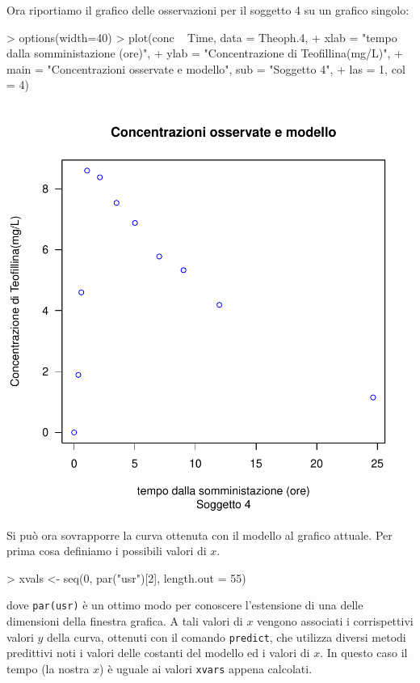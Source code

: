 \documentclass[onecolumn,11pt]{book}
\begin{document}
Ora riportiamo il grafico delle osservazioni per il soggetto 4 su un grafico singolo:

\begin{Schunk}
\begin{Sinput}
> options(width=40)
> plot(conc ~ Time, data = Theoph.4,
+ xlab = "tempo dalla somministazione (ore)",
+  ylab = "Concentrazione di Teofillina(mg/L)", 
+ main = "Concentrazioni osservate e modello", sub = "Soggetto 4",
+ las = 1, col = 4)
\end{Sinput}
\end{Schunk}
\includegraphics{statisticaconR-321}

Si pu\`o ora sovrapporre la curva ottenuta con il modello al grafico attuale. 
Per prima cosa definiamo i possibili valori di $x$.

\begin{Schunk}
\begin{Sinput}
> xvals <- seq(0, par("usr")[2], length.out = 55)
\end{Sinput}
\end{Schunk}

dove \texttt{par(usr)}  \`e un ottimo modo per conoscere l'estensione di una delle dimensioni della finestra grafica. A tali valori di $x$ vengono associati i corrispettivi valori $y$ della curva, ottenuti con il comando \texttt{predict}, che utilizza diversi metodi predittivi noti i valori delle costanti del modello ed i valori di $x$. In questo caso il tempo (la nostra $x$)  \`e  uguale ai valori \texttt{xvars} appena calcolati.
\end{document}
